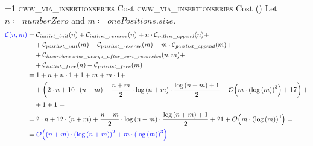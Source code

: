 \setcounter{cwwviainsertionseriescostcounter}{1}
\newcommand{\cwwviainsertionseriescostframe}{%
    \ifnum\value{cwwviainsertionseriescostcounter}=1
        \textsc{cww\_via\_insertionseries} Cost%
    \else
        \textsc{cww\_via\_insertionseries} Cost (\thecwwviainsertionseriescostcounter)%
    \fi
}  
        \begin{frame}{\cwwviainsertionseriescostframe}
            \footnotesize
            Let $n \coloneqq numberZero$ and $m \coloneqq onePositions.size$.
            \begin{align*}
                \textcolor{blue}{{\mathcal{C}{\left(n, m\right)}}} = & \; \mathcal{C}_{intlist\_init}{\left(n\right)} + \mathcal{C}_{intlist\_reserve}{\left(n\right)} + n \cdot \mathcal{C}_{intlist\_append}{\left(n\right)} + \\
                & + \mathcal{C}_{pairlist\_init}{\left(m\right)} + \mathcal{C}_{pairlist\_reserve}{\left(m\right)} + m \cdot \mathcal{C}_{pairlist\_append}{\left(m\right)} + \\
                & + \mathcal{C}_{insertionseries\_merge\_after\_sort\_recursive}{\left(n, m\right)} + \\
                & + \mathcal{C}_{intlist\_free}{\left(n\right)} + \mathcal{C}_{pairlist\_free}{\left(m\right)} = \\
                = & \; 1 + n + n \cdot 1 + 1 + m + m \cdot 1 + \\
                & + \left(2 \cdot n + 10 \cdot \left(n + m\right) + \frac{n + m}{2} \cdot \log{\left(n + m\right)} \cdot \frac{\log{\left(n + m\right)} + 1}{2} + \mathcal{O}{\left(m \cdot \left(\log{\left(m\right)}\right)^3\right)} + 17\right) + \\
                & + 1 + 1 = \\
                = & \; 2 \cdot n + 12 \cdot \left(n + m\right) + \frac{n + m}{2} \cdot \log{\left(n + m\right)} \cdot \frac{\log{\left(n + m\right)} + 1}{2} + 21 + \mathcal{O}{\left(m \cdot \left(\log{\left(m\right)}\right)^3\right)} = \\
                = & \; \textcolor{blue}{\mathcal{O}{\left(\left(n + m\right) \cdot \left(\log{\left(n + m\right)}\right)^2 + m \cdot \left(\log{\left(m\right)}\right)^3\right)}}
            \end{align*}
        \end{frame}

